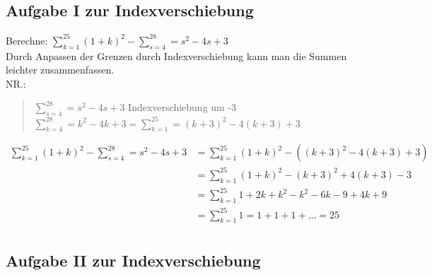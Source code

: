 \subsection{Aufgabe I zur Indexverschiebung}

Berechne:
$ \sum\limits_{k=1}^{25}(1+k)^2-\sum\limits_{s=4}^{28}=s^2-4s+3  $\\
Durch Anpassen der Grenzen durch Indexverschiebung kann man die Summen leichter zusammenfassen.\\
NR.:\\
\begin{quote}
	$\sum\limits_{s=4}^{28}=s^2-4s+3  $ Indexverschiebung um -3\\
	$ \sum\limits_{k=4}^{28}=k^2-4k+3= \sum\limits_{k=1}^{25}=(k+3)^2-4(k+3)+3$\\
\end{quote}
\begin{align*}
	\sum\limits_{k=1}^{25}(1+k)^2-\sum\limits_{s=4}^{28}=s^2-4s+3&=\sum\limits_{k=1}^{25}(1+k)^2-((k+3)^2-4(k+3)+3) \\
	&=\sum\limits_{k=1}^{25}(1+k)^2-(k+3)^2+4(k+3)-3\\
	&=\sum\limits_{k=1}^{25}1+2k+k^2-k^2-6k-9+4k+9\\
	&=\sum\limits_{k=1}^{25}1=1+1+1+\ldots = 25\\
\end{align*}
\subsection{Aufgabe II zur Indexverschiebung}

